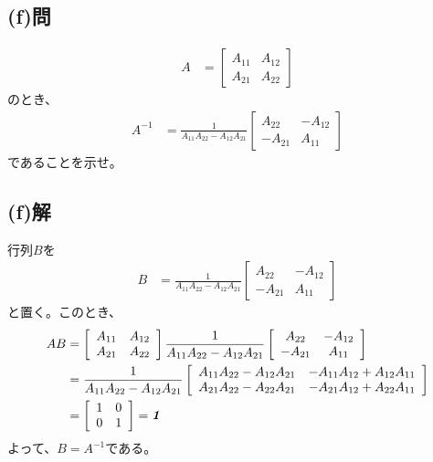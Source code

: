 \subsection{(f)問}
\begin{align}
	A
&=
	\left[
	\begin{array}{cc}
		A_{11} & A_{12} \\
		A_{21} & A_{22}
	\end{array}
	\right]
\end{align}
のとき、
\begin{align}
	A^{-1}
&=
	\frac{
		1
	}{
		A_{11}A_{22}-A_{12}A_{21}
	}
		\left[
		\begin{array}{cc}
			 A_{22} & -A_{12} \\
			-A_{21} &  A_{11}
		\end{array}
		\right]
\end{align}
であることを示せ。


\subsection{(f)解}
行列$B$を
\begin{align}
	B
&=
	\frac{
		1
	}{
		A_{11}A_{22}-A_{12}A_{21}
	}
		\left[
		\begin{array}{cc}
			 A_{22} & -A_{12} \\
			-A_{21} &  A_{11}
		\end{array}
		\right]
\end{align}
と置く。このとき、
\begin{align}
	AB
&=
	\left[
	\begin{array}{cc}
		A_{11} & A_{12} \\
		A_{21} & A_{22}
	\end{array}
	\right]
		\frac{
			1
		}{
			A_{11}A_{22}-A_{12}A_{21}
		}
			\left[
			\begin{array}{cc}
				 A_{22} & -A_{12} \\
				-A_{21} &  A_{11}
			\end{array}
			\right] \\
%
%
&=
	\frac{
		1
	}{
		A_{11}A_{22}-A_{12}A_{21}
	}
		\left[
		\begin{array}{cc}
			A_{11}A_{22}-A_{12}A_{21} & -A_{11}A_{12}+A_{12}A_{11} \\
			A_{21}A_{22}-A_{22}A_{21} & -A_{21}A_{12}+A_{22}A_{11}
		\end{array}
		\right] \\
%
%
&=
	\left[
	\begin{array}{cc}
		1 & 0 \\
		0 & 1
	\end{array}
	\right]
=
	\identity
\end{align}
よって、$B=A^{-1}$である。
